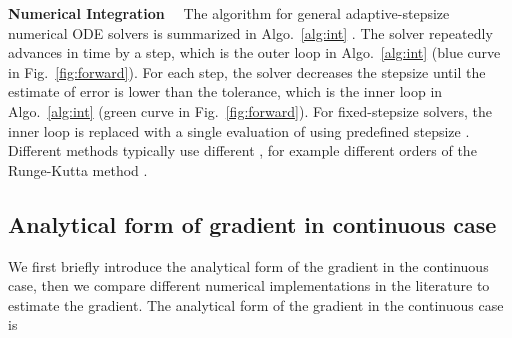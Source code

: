 \documentclass{article} \usepackage{iclr2021_conference,times}
\begin{document}
\textbf{Numerical Integration} \ \ The algorithm for general adaptive-stepsize numerical ODE solvers is summarized in Algo.~\ref{alg:int} \citep{wanner1996solving}. The solver repeatedly advances in time by a step, which is the outer loop in Algo.~\ref{alg:int} (blue curve in Fig.~\ref{fig:forward}). For each step, the solver decreases the stepsize until the estimate of error
is lower than the tolerance, which is the inner loop in Algo.~\ref{alg:int} (green curve in Fig.~\ref{fig:forward}). For fixed-stepsize solvers, the inner loop is replaced with a single evaluation of  using predefined stepsize . Different methods typically use different , for example different orders of the Runge-Kutta method \citep{runge1895numerische}. 
\subsection{Analytical form of gradient in continuous case}
We first briefly introduce the analytical form of the gradient in the continuous case, then we compare different numerical implementations in the literature to estimate the gradient. The analytical form of the gradient in the continuous case is
\end{document}

